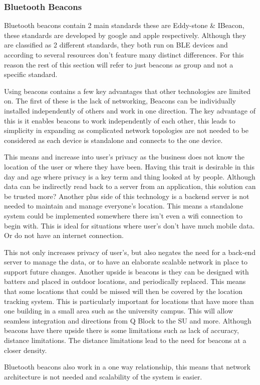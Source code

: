 \subsubsection{Bluetooth Beacons}
Bluetooth beacons contain 2 main standards these are Eddy-stone \& IBeacon, these standards are developed by google and apple respectively. Although they are classified as 2 different standards, they both run on BLE devices and according to several resources don’t feature many distinct differences. For this reason the rest of this section will refer to just beacons as group and not a specific standard.

Using beacons contains a few key advantages that other technologies are limited on. The first of these is the lack of networking, Beacons can be individually installed independently of others and work in one direction. The key advantage of this is it enables beacons to work independently of each other, this leads to simplicity in expanding as complicated network topologies are not needed to be considered as each device is standalone and connects to the one device.

This means and increase into user’s privacy as the business does not know the location of the user or where they have been. Having this trait is desirable in this day and age where privacy is a key term and thing looked at by people. Although data can be indirectly read back to a server from an application, this solution can be trusted more?
Another plus side of this technology is a backend server is not needed to maintain and manage everyone’s location. This means a standalone system could be implemented somewhere there isn’t even a wifi connection to begin with. This is ideal for situations where user’s don’t have much mobile data. Or do not have an internet connection.

This not only increases privacy of user’s, but also negates the need for a back-end server to manage the data, or to have an elaborate scalable network in place to support future changes. 
Another upside is beacons is they can be designed with batters and placed in outdoor locations, and periodically replaced. This means that some locations that could be missed will then be covered by the location tracking system. This is particularly important for locations that have more than one building in a small area such as the university campus. This will allow seamless integration and directions from Q Block to the SU and more.
Although beacons have there upside there is some limitations such as lack of accuracy, distance limitations. The distance limitations lead to the need for beacons at a closer density.

Bluetooth beacons also work in a one way relationship, this means that network architecture is not needed and scalability of the system is easier.
